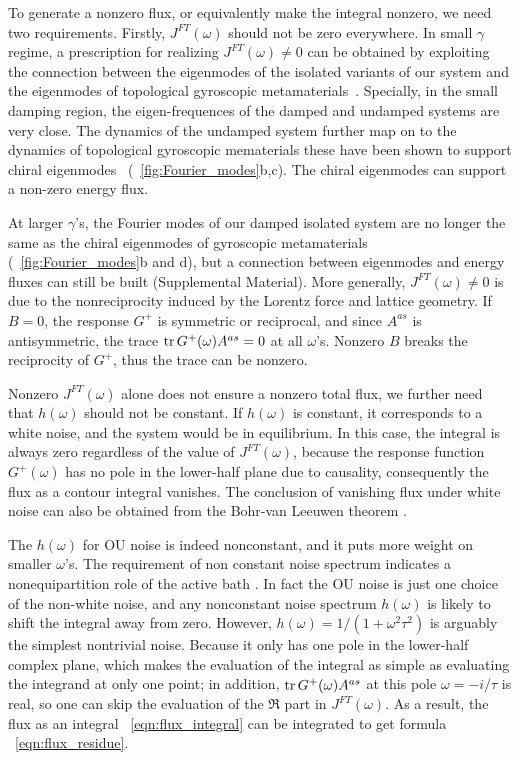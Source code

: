 \documentclass[
 preprint,
 preprintnumbers,
 amsmath,amssymb,
 aps,
 pre,
 longbibliography,
 superscriptaddress,
 10pt, twocolumn
]{revtex4-1}
\begin{document}
To generate a nonzero flux, or equivalently make the integral nonzero, we need two requirements.
Firstly, $J^{FT}(\omega)$ should not be zero everywhere.
In small $\gamma$ regime, a prescription for realizing $J^{FT}(\omega) \neq 0$ can be obtained by exploiting the connection between the eigenmodes of the isolated variants of our system and the eigenmodes of topological gyroscopic metamaterials~\cite{Nash2015TopologicalMechanics}. Specially, in the small damping region, the eigen-frequences of the damped and undamped systems are very close. The dynamics of the undamped system further map on to the dynamics of topological gyroscopic mematerials \texendash these have been shown to support chiral eigenmodes~\cite{Nash2015TopologicalMechanics} (\figurename~\ref{fig:Fourier_modes}b,c). The chiral eigenmodes can support a non-zero energy flux.  


At larger $\gamma$'s, the Fourier modes of our damped isolated system are no longer the same as the chiral eigenmodes of gyroscopic metamaterials (\figurename~\ref{fig:Fourier_modes}b and d), but a connection between eigenmodes and energy fluxes can still be built (Supplemental Material).
More generally, $J^{FT}(\omega) \neq 0$ is due to the nonreciprocity induced by the Lorentz force and lattice geometry. If $B=0$, the response $G^+$ is symmetric or reciprocal, and since $A^{as}$ is antisymmetric, the trace $\tr G^+(\omega) A^{as}=0$ at all $\omega$'s. Nonzero $B$ breaks the reciprocity of $G^+$, thus the trace can be nonzero.

Nonzero $J^{FT}(\omega)$ alone does not ensure a nonzero total flux, we further need that $h(\omega)$ should not be constant.
If $h(\omega)$ is constant, it corresponds to a white noise, and the system would be in equilibrium. In this case, the integral is always zero regardless of the value of $J^{FT}(\omega)$, because the response function $G^+(\omega)$ has no pole in the lower-half plane due to causality, consequently the flux as a contour integral vanishes.
The conclusion of vanishing flux under white noise can also be obtained from the Bohr-van Leeuwen theorem \cite{Pradhan2010NonexistenceClassical}.

The $h(\omega)$ for OU noise is indeed nonconstant, and it puts more weight on smaller $\omega$'s.
The requirement of non constant noise spectrum indicates a nonequipartition role of the active bath \cite{Lee2017FluctuationSpectra}.
In fact the OU noise is just one choice of the non-white noise, and any nonconstant noise spectrum $h(\omega)$ is likely to shift the integral away from zero.
However, $h(\omega)=1/(1+\omega^2\tau^2)$ is arguably the simplest nontrivial noise. Because it only has one pole in the lower-half complex plane, which makes the evaluation of the integral as simple as evaluating the integrand at only one point; in addition, $\tr G^+(\omega)A^{as}$ at this pole $\omega=-i/\tau$ is real, so one can skip the evaluation of the $\Re$ part in $J^{FT}(\omega)$. As a result, the flux as an integral \eqnname~\eqref{eqn:flux_integral} can be integrated to get formula \eqnname~\eqref{eqn:flux_residue}.
\end{document}
